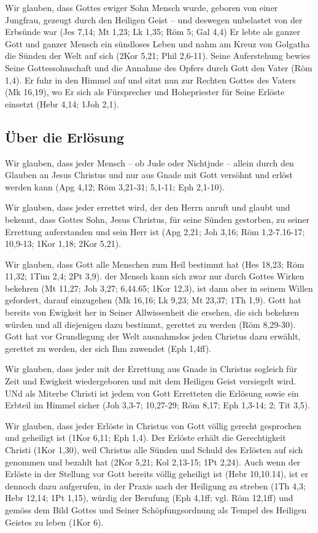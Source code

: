 Wir glauben, dass Gottes ewiger Sohn Mensch wurde, geboren von einer Jungfrau, gezeugt durch den Heiligen Geist -- und deswegen unbelastet von der Erbsünde war (Jes 7,14; Mt 1,23; Lk 1,35; Röm 5; Gal 4,4) Er lebte als ganzer Gott und ganzer Mensch ein sündloses Leben und nahm am Kreuz von Golgatha die Sünden der Welt auf sich (2Kor 5,21; Phil 2,6-11). Seine Auferstehung bewies Seine Gottessohnschaft und die Annahme des Opfers durch Gott den Vater (Röm 1,4). Er fuhr in den Himmel auf und sitzt nun zur Rechten Gottes des Vaters (Mk 16,19), wo Er sich als Fürsprecher und Hohepriester für Seine Erlöste einsetzt (Hebr 4,14; 1Joh 2,1).
\subsection{Über die Erlösung}
Wir glauben, dass jeder Mensch -- ob Jude oder Nichtjude -- allein durch den Glauben an Jesus Christus und nur aus Gnade mit Gott versöhnt und erlöst werden kann (Apg 4,12; Röm 3,21-31; 5,1-11; Eph 2,1-10).

Wir glauben, dass jeder errettet wird, der den Herrn anruft und glaubt und bekennt, dass Gottes Sohn, Jesus Christus, für seine Sünden gestorben, zu seiner Errettung auferstanden und sein Herr ist (Apg 2,21; Joh 3,16; Röm 1,2-7.16-17; 10,9-13; 1Kor 1,18; 2Kor 5,21).

Wir glauben, dass Gott alle Menschen zum Heil bestimmt hat (Hes 18,23; Röm 11,32; 1Tim 2,4; 2Pt 3,9). der Mensch kann sich zwar nur durch Gottes Wirken bekehren (Mt 11,27; Joh 3,27; 6,44.65; 1Kor 12,3), ist dann aber in seinem Willen gefordert, darauf einzugehen (Mk 16,16; Lk 9,23; Mt 23,37; 1Th 1,9). Gott hat bereits von Ewigkeit her in Seiner Allwissenheit die ersehen, die sich bekehren würden und all diejenigen dazu bestimmt, gerettet zu werden (Röm 8,29-30). Gott hat vor Grundlegung der Welt ausnahmslos jeden Christus dazu erwählt, gerettet zu werden, der sich Ihm zuwendet (Eph 1,4ff).

Wir glauben, dass jeder mit der Errettung aus Gnade in Christus sogleich für Zeit und Ewigkeit wiedergeboren und mit dem Heiligen Geist versiegelt wird. UNd als Miterbe Christi ist jedem von Gott Erretteten die Erlösung sowie ein Erbteil im Himmel sicher (Joh 3,3-7; 10,27-29; Röm 8,17; Eph 1,3-14; 2; Tit 3,5).

Wir glauben, dass jeder Erlöste in Christus von Gott völlig gerecht gesprochen und geheiligt ist (1Kor 6,11; Eph 1,4). Der Erlöste erhält die Gerechtigkeit Christi (1Kor 1,30), weil Christus alle Sünden und Schuld des Erlösten auf sich genommen und bezahlt hat (2Kor 5,21; Kol 2,13-15; 1Pt 2,24). Auch wenn der Erlöste in der Stellung vor Gott bereits völlig geheiligt ist (Hebr 10,10.14), ist er dennoch dazu aufgerufen, in der Praxis nach der Heiligung zu streben (1Th 4,3; Hebr 12,14; 1Pt 1,15), würdig der Berufung (Eph 4,1ff; vgl. Röm 12,1ff) und gemöss dem Bild Gottes und Seiner Schöpfungsordnung als Tempel des Heiligen Geistes zu leben (1Kor 6).
